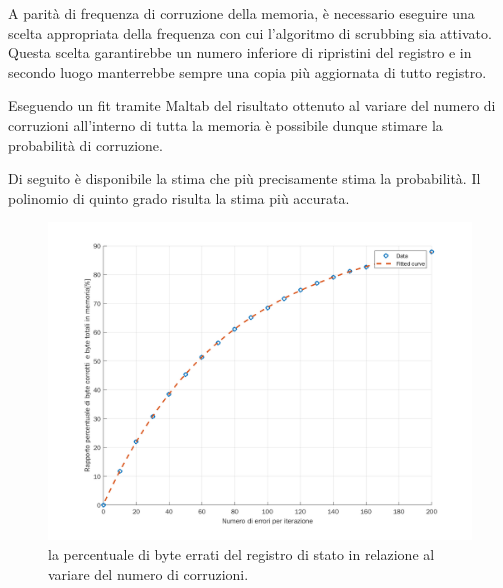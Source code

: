 \documentclass[LaM,binding=0.6cm]{../sapthesis}
\begin{document}
A parità di frequenza di corruzione della memoria, è necessario eseguire una scelta appropriata della frequenza con cui l'algoritmo di scrubbing sia attivato. Questa scelta garantirebbe un numero inferiore di ripristini del registro e in secondo luogo manterrebbe sempre una copia più aggiornata di tutto registro.

Eseguendo un fit tramite Maltab del risultato ottenuto al variare del numero di corruzioni all'interno di tutta la memoria è possibile dunque stimare la probabilità di corruzione.

Di seguito è disponibile la stima che più precisamente stima la probabilità. Il polinomio di quinto grado risulta la stima più accurata.

\begin{figure}[htbp]
\centerline{\includegraphics[scale=0.6]{examples/scrubbingTestParziali.png}}
\caption{la percentuale di byte errati del registro di stato in relazione al variare del numero di corruzioni.}
\label{fig}
\end{figure}
\vspace{0.5cm}
\newpage
\end{document}
